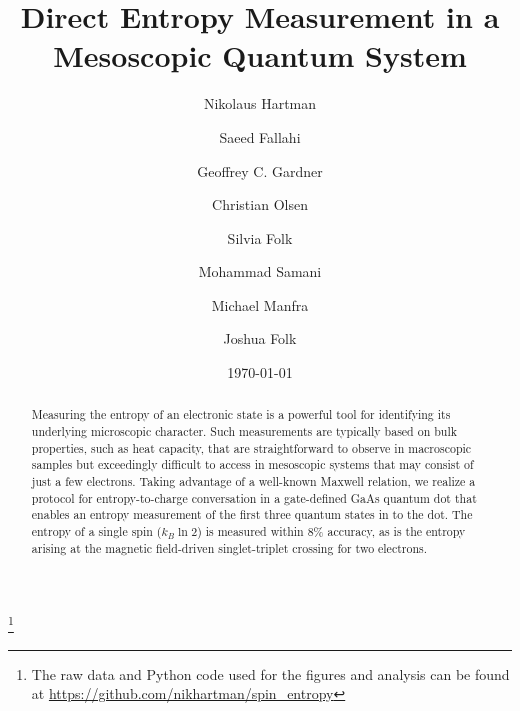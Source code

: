 \documentclass[twocolumn,showpacs,preprintnumbers,amsmath,amssymb,pra,aps,superscriptaddress]{revtex4-1}
\begin{document}
\title{Direct Entropy Measurement in a Mesoscopic Quantum System}
\author{Nikolaus Hartman}
\thanks{The raw data and Python code used for the figures and analysis can be found at \url{https://github.com/nikhartman/spin_entropy}}
\author{Saeed Fallahi}
\author{Geoffrey C. Gardner}
\author{Christian Olsen}
\author{Silvia Folk}
\author{Mohammad Samani}
\author{Michael Manfra}
\author{Joshua Folk}
\date{\today}

\begin{abstract}

Measuring the entropy of an electronic state is a powerful tool for identifying its underlying microscopic character.  Such measurements are typically based on bulk properties, such as heat capacity, that are straightforward to observe in macroscopic samples but exceedingly difficult to access in mesoscopic systems that may consist of just a few electrons. Taking advantage of a well-known Maxwell relation, we realize a protocol for entropy-to-charge conversation in a gate-defined GaAs quantum dot that enables an entropy measurement of the first three quantum states in to the dot. The entropy of a single spin ($k_B \ln{2}$) is measured within 8\% accuracy, as is the entropy arising at the magnetic field-driven singlet-triplet crossing for two electrons.

\end{abstract}

\maketitle
\end{document}
